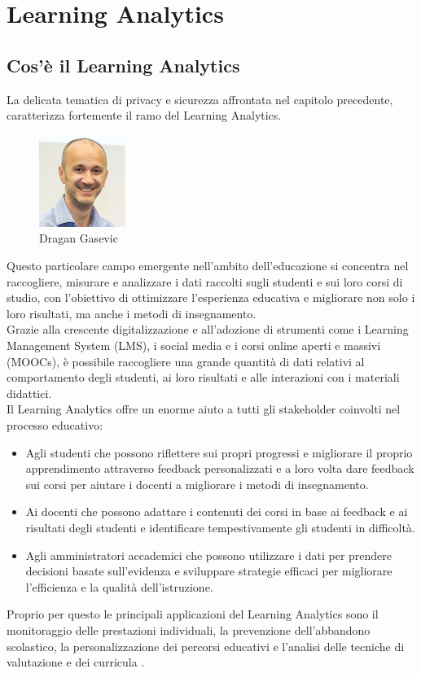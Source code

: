 \chapter{Learning Analytics}
\section{Cos'è il Learning Analytics}
La delicata tematica di privacy e sicurezza affrontata nel capitolo precedente, caratterizza fortemente il ramo
del Learning Analytics.
\begin{figure}
    \centering
    \includegraphics[width=0.25\textwidth]{Immagini/Dragan Gasevic.jpg}
    \caption{Dragan Gasevic}
\end{figure}
Questo particolare campo emergente nell'ambito dell'educazione si concentra nel raccogliere, misurare e analizzare i dati raccolti sugli studenti e sui loro corsi
di studio, con l'obiettivo di ottimizzare l'esperienza educativa e migliorare non solo i loro risultati, ma anche i metodi di insegnamento. 
\\Grazie alla crescente digitalizzazione e all'adozione di strumenti 
come i Learning Management System (LMS), i social media e i corsi online aperti e massivi (MOOCs), è possibile raccogliere una grande quantità di dati relativi al comportamento degli studenti, 
ai loro risultati e alle interazioni con i materiali didattici. 
\\Il Learning Analytics offre un enorme aiuto a tutti gli stakeholder coinvolti nel processo educativo:
\begin{itemize}
    \item Agli studenti che possono riflettere sui propri progressi e migliorare il proprio apprendimento attraverso feedback personalizzati e a loro volta dare feedback sui corsi per aiutare i docenti a migliorare i metodi di insegnamento.
    \item Ai docenti che possono adattare i contenuti dei corsi in base ai feedback e ai risultati degli studenti e identificare tempestivamente gli studenti in difficoltà.
    \item Agli amministratori accademici che possono utilizzare i dati per prendere decisioni basate sull'evidenza e sviluppare strategie efficaci per migliorare l'efficienza e la qualità dell'istruzione.
\end{itemize}
Proprio per questo le principali applicazioni del Learning Analytics sono il monitoraggio delle prestazioni individuali, la prevenzione dell'abbandono scolastico,
la personalizzazione dei percorsi educativi e l'analisi delle tecniche di valutazione e dei curricula \cite{wikipedia_learning_analytics}.


